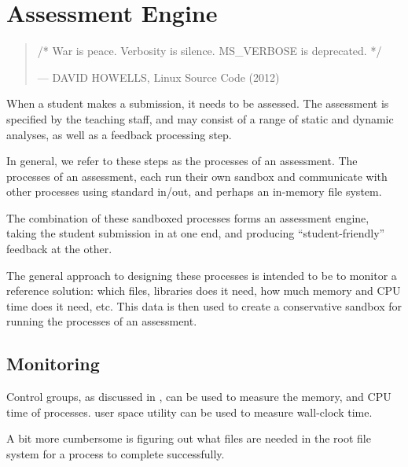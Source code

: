 
\chapter{Assessment Engine}

\begin{quotation}

\footnotesize\sffamily\itshape

\begin{flushright}

/* War is peace. Verbosity is silence. MS\_VERBOSE is deprecated. */

\smallbreak

\upshape

--- DAVID HOWELLS, Linux Source Code (2012)

\end{flushright}

\end{quotation}

When a student makes a submission, it needs to be assessed. The
assessment is specified by the teaching staff, and may consist of a range of
static and dynamic analyses, as well as a feedback processing step.

In general, we refer to these steps as the processes of an assessment. The
processes of an assessment, each run their own sandbox and communicate with
other processes using standard in/out, and perhaps an in-memory file system. 

The combination of these sandboxed processes forms an assessment engine, taking
the student submission in at one end, and producing ``student-friendly''
feedback at the other.

The general approach to designing these processes is intended to be to monitor
a reference solution: which files, libraries does it need, how much memory and
CPU time does it need, etc. This data is then used to create a conservative
sandbox for running the processes of an assessment.

\section{Monitoring}

Control groups, as discussed in , can
be used to measure the memory, and CPU time of processes. \cite{man-1-time}
user space utility can be used to measure wall-clock time.

A bit more cumbersome is figuring out what files are needed in the root file
system for a process to complete successfully.
